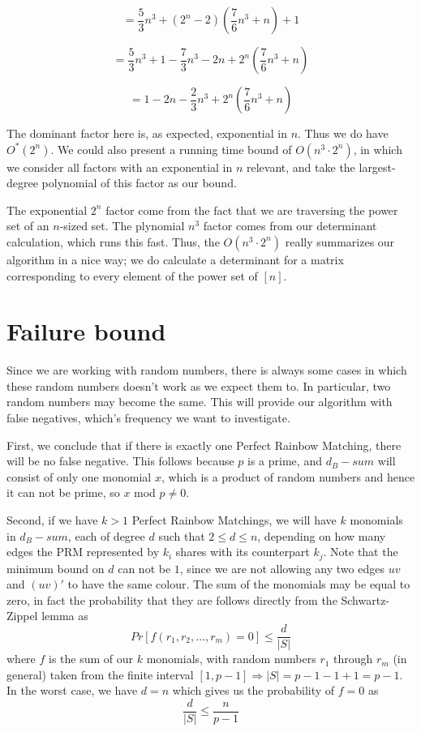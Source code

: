 \documentclass{tufte-handout}
\begin{document}
$$
= \frac{5}{3}n^3 + (2^n - 2)(\frac{7}{6}n^3 + n) + 1
$$

$$
= \frac{5}{3}n^3 + 1 - \frac{7}{3}n^3 - 2n + 2^n(\frac{7}{6}n^3 + n)
$$

$$
= 1 - 2n - \frac{2}{3}n^3 + 2^n(\frac{7}{6}n^3 + n)
$$

The dominant factor here is, as expected, exponential in $n$. Thus we do have $O^*(2^n)$. We could also present a running time bound of $O(n^3\cdot2^n)$, in which we consider all factors with an exponential in $n$ relevant, and take the largest-degree polynomial of this factor as our bound.

The exponential $2^n$ factor come from the fact that we are traversing the power set of an $n$-sized set. The plynomial $n^3$ factor comes from our determinant calculation, which runs this fast. Thus, the $O(n^3\cdot2^n)$ really summarizes our algorithm in a nice way; we do calculate a determinant for a matrix corresponding to every element of the power set of $[n]$.

\section{Failure bound}
Since we are working with random numbers, there is always some cases in which these random numbers doesn't work as we expect them to. In particular, two random numbers may become the same. This will provide our algorithm with false negatives, which's frequency we want to investigate.

First, we conclude that if there is exactly one Perfect Rainbow Matching, there will be no false negative. This follows because $p$ is a prime, and $d_B - sum$ will consist of only one monomial $x$, which is a product of random numbers and hence it can not be prime, so $x$ mod $p \neq 0$.

Second, if we have $k > 1$ Perfect Rainbow Matchings, we will have $k$ monomials in $d_B - sum$, each of degree $d$ such that $2 \leq d \leq n$, depending on how many edges the PRM represented by $k_i$ shares with its counterpart $k_j$. Note that the minimum bound on $d$ can not be $1$, since we are not allowing any two edges $uv$ and $(uv)'$ to have the same colour. The sum of the monomials may be equal to zero, in fact the probability that they are follows directly from the Schwartz-Zippel lemma as\cite{zippel}
$$
Pr[f(r_1,r_2,\ldots,r_m) = 0] \leq \frac{d}{|S|} 
$$
where $f$ is the sum of our $k$ monomials, with random numbers $r_1$ through $r_m$ (in general) taken from the finite interval $[1,p-1] \Rightarrow |S| = p - 1 - 1 + 1 = p - 1$. In the worst case, we have $d = n$ which gives us the probability of $f = 0$ as
$$
\frac{d}{|S|} \leq \frac{n}{p-1}
$$
\end{document}
